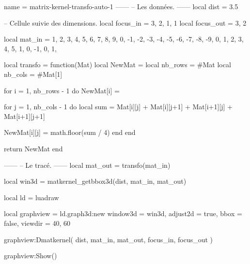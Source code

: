 \documentclass[border = 3pt]{standalone}
\begin{document}
\begin{luadraw}{name = matrix-kernel-transfo-auto-1}
------
-- Les données.
------
local dist = 3.5

-- Cellule suivie des dimensions.
local focus_in  = { {3, 2}, {1, 1} }
local focus_out = {3, 2}

local mat_in = {
  { 1,  2,  3,  4,  5},
  { 6,  7,  8,  9,  0},
  {-1, -2, -3, -4, -5},
  {-6, -7, -8, -9,  0},
  { 1,  2,  3,  4,  5},
  { 1,  0, -1,  0,  1},
}

local transfo = function(Mat)
  local NewMat  = {}
  local nb_rows = #Mat
  local nb_cols = #Mat[1]

  for i = 1, nb_rows - 1 do
    NewMat[i] = {}

    for j = 1, nb_cols - 1 do
      local sum = Mat[i][j] + Mat[i][j+1] + Mat[i+1][j] + Mat[i+1][j+1]

      NewMat[i][j] = math.floor(sum / 4)
    end
  end

  return NewMat
end

------
-- Le tracé.
------
local mat_out = transfo(mat_in)

local win3d = matkernel_getbbox3d(dist, mat_in, mat_out)

local ld = luadraw

local graphview = ld.graph3d:new{
  window3d = win3d,
  adjust2d = true,
  bbox     = false,
  viewdir  = {40, 60}
}

graphview:Dmatkernel(
  dist,
  mat_in, mat_out,
  focus_in, focus_out
)

graphview:Show()
\end{luadraw}
\end{document}
